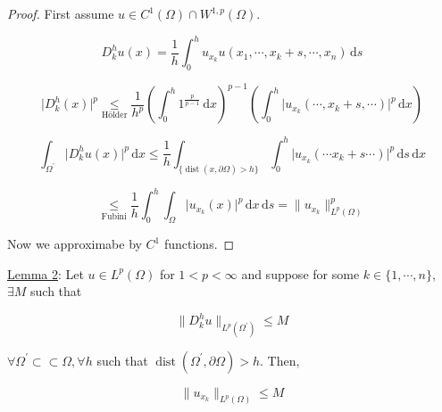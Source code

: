 \documentclass{article}
\theoremstyle{definition}
\begin{document}
\begin{proof}
    First assume \(u\in C^1(\Omega) \cap W^{1,p}(\Omega)\).

    \[
        D^h_k u(x) = \frac{1}{h} \int_{0}^{h} u_{x_k} u(x_1, \cdots , x_k + s, \cdots , x_n) \,\mathrm{d}s 
    \]

    \[
        \vert D^h_k (x) \vert ^ p \underset{\text{H\"older}}{\leq} \frac{1}{h^p} \left( \int_{0}^{h} 1^{\frac{p}{p-1}} \,\mathrm{d}x  \right)^{p-1} \left( \int_{0}^{h} \vert u_{x_k}(\cdots,x_{k}+s, \cdots ) \vert ^ p \,\mathrm{d}x  \right)
    \]

    \[
        \int_{\Omega^{\prime}} \vert D_k^h u(x) \vert ^ p \,\mathrm{d}x \leq \frac{1}{h} \int_{\{\operatorname{dis t} (x, \partial \Omega) > h \} } \int_{0}^{h} \vert u_{x_k}(\cdots x_k + s \cdots) \vert ^p \,\mathrm{d}s \,\mathrm{d}x 
    \]

    \[
        \underset{\text{Fubini}}{\leq} \frac{1}{h} \int_{0}^{h} \int_{\Omega} \vert u_{x_k}(x) \vert ^ p \,\mathrm{d}x  \,\mathrm{d}s = \lVert u_{x_k} \rVert _{L^p(\Omega)}^p
    \]

    Now we approximabe by \(C^1\) functions.

\end{proof}

\underline{Lemma 2}: Let \(u\in L^p(\Omega)\) for \(1 < p < \infty\) and suppose for some \(k\in \{ 1, \cdots , n \} \), \(\exists M\) such that

\[
    \lVert D^h_k u \rVert _{L^p(\Omega^{\prime})} \leq M
\]

\(\forall \Omega ^{\prime} \subset \subset \Omega , \forall h\) such that \(\operatorname{dis t} (\Omega ^{\prime} , \partial \Omega) > h\). Then,

\[
    \lVert u_{x_k} \rVert _{L^p(\Omega)} \leq M
\]
\end{document}
